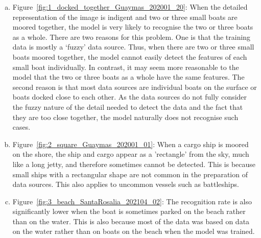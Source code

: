 \begin{enumerate}[(a)]
    \item  Figure~\ref{fig:1_docked_together_Guaymas_202001_20}: When the detailed representation of the image is indigent and two or three small boats are moored together, the model is very likely to recognise the two or three boats as a whole. There are two reasons for this problem. One is that the training data is mostly a `fuzzy' data source. Thus, when there are two or three small boats moored together, the model cannot easily detect the features of each small boat individually. In contrast, it may seem more reasonable to the model that the two or three boats as a whole have the same features. The second reason is that most data sources are individual boats on the surface or boats docked close to each other. As the data sources do not fully consider the fuzzy nature of the detail needed to detect the data and the fact that they are too close together, the model naturally does not recognise such cases.
    
    \item Figure~\ref{fig:2_square_Guaymas_202001_01}: When a cargo ship is moored on the shore, the ship and cargo appear as a 'rectangle' from the sky, much like a long jetty, and therefore sometimes cannot be detected. This is because small ships with a rectangular shape are not common in the preparation of data sources. This also applies to uncommon vessels such as battleships. 

    \item Figure~\ref{fig:3_beach_SantaRosalia_202104_02}: The recognition rate is also significantly lower when the boat is sometimes parked on the beach rather than on the water. This is also because most of the data was based on data on the water rather than on boats on the beach when the model was trained.

\end{enumerate}

